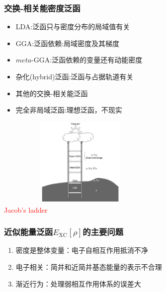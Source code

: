 \documentclass[cjk,slidestop,compress,mathserif,blue]{beamer}
\begin{document}
{
\frametitle{交换-相关能密度泛函}
\begin{minipage}[b]{0.72\linewidth}
 \hspace*{-15pt}
 \begin{itemize}%
	 \setlength{\itemsep}{10pt}
 \item \textrm{LDA}:泛函只与密度分布的局域值有关
 \item \textrm{GGA}:泛函依赖:局域密度及其梯度
 \item $meta$-\textrm{GGA}:泛函依赖的变量还有动能密度
 \item 杂化(\textrm{hybrid})泛函:泛函与占据轨道有关
 \item 其他的交换-相关能泛函
 \item<1-> 完全非局域泛函:理想泛函，不现实
 \end{itemize}
\end{minipage}
\hfill
\begin{minipage}[b]{0.26\linewidth}
\includegraphics[height=1.7in,width=3.18in,viewport=10 5 1380 700,clip]{Figures/Jacobi-ladder.png}\\
{\small \textcolor{red}{\textrm{Jacob's ladder}}}
\end{minipage}
}

\frame                               %
{
	\frametitle{近似能量泛函$E_{\mathrm{XC}}[\rho]$的主要问题}
\vskip 20pt
\begin{enumerate}%
   \setlength{\itemsep}{30pt}
 \item  密度是整体变量：电子自相互作用抵消不净%
 \item  电子相关：简并和近简并基态能量的表示不合理
 \item  渐近行为：处理弱相互作用体系的误差大
 \end{enumerate}
}
\end{document}
